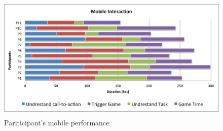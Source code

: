 \begin{figure}[H]
    \centering
    \includegraphics[width=12cm,height=6cm]{Appendices/6/mobile_performance}%
    \caption{Pariticipant's mobile performance}%
    \label{fig:body_performance}%
\end{figure}






